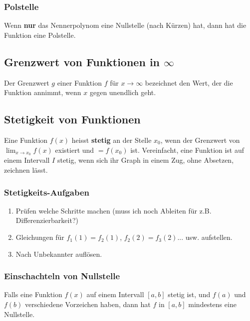 \subsubsection{Polstelle}
Wenn \textbf{nur} das Nennerpolynom eine Nullstelle (nach Kürzen) hat, dann hat die Funktion eine Polstelle.
\begin{center}
\end{center}
\subsection{Grenzwert von Funktionen in $\infty$}
Der Grenzwert $g$ einer Funktion $f$ für $x \to \infty$ bezeichnet den Wert, der die Funktion annimmt, 
wenn $x$ gegen unendlich geht.
\subsection{Stetigkeit von Funktionen}
Eine Funktion $f(x)$ heisst \textbf{stetig} an der Stelle $x_0$, wenn der Grenzwert von 
$\lim_{x \to x_0} f(x)$ existiert und $= f(x_0)$ ist. Vereinfacht, eine Funktion ist auf einem Intervall 
$I$ stetig, wenn sich ihr Graph in einem Zug, ohne Absetzen, zeichnen lässt.
\subsubsection{Stetigkeits-Aufgaben}
\begin{enumerate}
    \item Prüfen welche Schritte machen (muss ich noch Ableiten für z.B. Differenzierbarkeit?)
    \item Gleichungen für $f_1(1) = f_2(1)$, $f_2(2) = f_3(2)$... usw. aufstellen.
    \item Nach Unbekannter auflösen.
\end{enumerate}
\subsubsection{Einschachteln von Nullstelle}
Falls eine Funktion $f(x)$ auf einem Intervall $[a, b]$ stetig ist, und $f(a)$ und $f(b)$ verschiedene
Vorzeichen haben, dann hat $f$ in $[a, b]$ mindestens eine Nullstelle.
